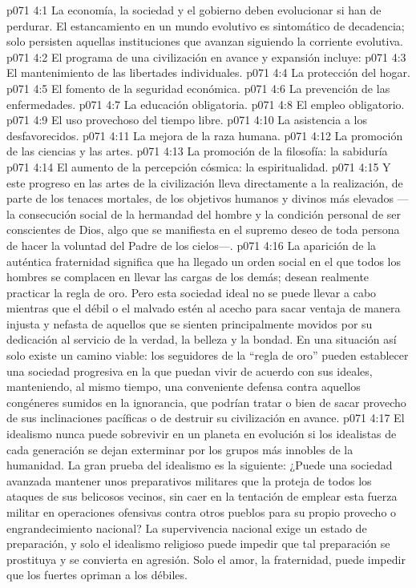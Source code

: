 \vs p071 4:1 La economía, la sociedad y el gobierno deben evolucionar si han de perdurar. El estancamiento en un mundo evolutivo es sintomático de decadencia; solo persisten aquellas instituciones que avanzan siguiendo la corriente evolutiva.
\vs p071 4:2 \pc El programa de una civilización en avance y expansión incluye:
\vs p071 4:3 El mantenimiento de las libertades individuales.
\vs p071 4:4 La protección del hogar.
\vs p071 4:5 El fomento de la seguridad económica.
\vs p071 4:6 La prevención de las enfermedades.
\vs p071 4:7 La educación obligatoria.
\vs p071 4:8 El empleo obligatorio.
\vs p071 4:9 El uso provechoso del tiempo libre.
\vs p071 4:10 La asistencia a los desfavorecidos.
\vs p071 4:11 La mejora de la raza humana.
\vs p071 4:12 La promoción de las ciencias y las artes.
\vs p071 4:13 La promoción de la filosofía: la sabiduría
\vs p071 4:14 El aumento de la percepción cósmica: la espiritualidad.
\vs p071 4:15 \pc Y este progreso en las artes de la civilización lleva directamente a la realización, de parte de los tenaces mortales, de los objetivos humanos y divinos más elevados ---la consecución social de la hermandad del hombre y la condición personal de ser conscientes de Dios, algo que se manifiesta en el supremo deseo de toda persona de hacer la voluntad del Padre de los cielos---.
\vs p071 4:16 La aparición de la auténtica fraternidad significa que ha llegado un orden social en el que todos los hombres se complacen en llevar las cargas de los demás; desean realmente practicar la regla de oro. Pero esta sociedad ideal no se puede llevar a cabo mientras que el débil o el malvado estén al acecho para sacar ventaja de manera injusta y nefasta de aquellos que se sienten principalmente movidos por su dedicación al servicio de la verdad, la belleza y la bondad. En una situación así solo existe un camino viable: los seguidores de la “regla de oro” pueden establecer una sociedad progresiva en la que puedan vivir de acuerdo con sus ideales, manteniendo, al mismo tiempo, una conveniente defensa contra aquellos congéneres sumidos en la ignorancia, que podrían tratar o bien de sacar provecho de sus inclinaciones pacíficas o de destruir su civilización en avance.
\vs p071 4:17 El idealismo nunca puede sobrevivir en un planeta en evolución si los idealistas de cada generación se dejan exterminar por los grupos más innobles de la humanidad. La gran prueba del idealismo es la siguiente: ¿Puede una sociedad avanzada mantener unos preparativos militares que la proteja de todos los ataques de sus belicosos vecinos, sin caer en la tentación de emplear esta fuerza militar en operaciones ofensivas contra otros pueblos para su propio provecho o engrandecimiento nacional? La supervivencia nacional exige un estado de preparación, y solo el idealismo religioso puede impedir que tal preparación se prostituya y se convierta en agresión. Solo el amor, la fraternidad, puede impedir que los fuertes opriman a los débiles.
